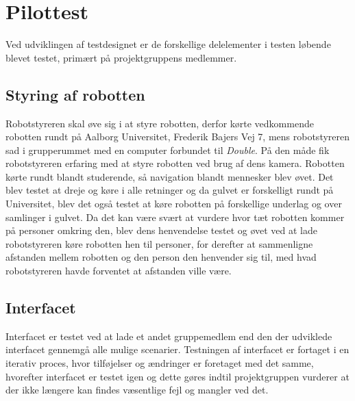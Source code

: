 \section{Pilottest}
\label{ParametrePilottest}
%
Ved udviklingen af testdesignet er de forskellige delelementer i testen løbende blevet testet, primært på projektgruppens medlemmer. \blankline
%
\subsection*{Styring af robotten}
Robotstyreren skal øve sig i at styre robotten, derfor kørte vedkommende robotten rundt på Aalborg Universitet, Frederik Bajers Vej 7, mens robotstyreren sad i grupperummet med en computer forbundet til \textit{Double}. På den måde fik robotstyreren erfaring med at styre robotten ved brug af dens kamera. Robotten kørte rundt blandt studerende, så navigation blandt mennesker blev øvet. Det blev testet at dreje og køre i alle retninger og da gulvet er forskelligt rundt på Universitet, blev det også testet at køre robotten på forskellige underlag og over samlinger i gulvet. 
% 
Da det kan være svært at vurdere hvor tæt robotten kommer på personer omkring den, blev dens henvendelse testet og øvet ved at lade robotstyreren køre robotten hen til personer, for derefter at sammenligne afstanden mellem robotten og den person den henvender sig til, med hvad robotstyreren havde forventet at afstanden ville være. \blankline
%
\subsection*{Interfacet}
Interfacet er testet ved at lade et andet gruppemedlem end den der udviklede interfacet gennemgå alle mulige scenarier. Testningen af interfacet er fortaget i en iterativ proces, hvor tilføjelser og ændringer er foretaget med det samme, hvorefter interfacet er testet igen og dette gøres indtil projektgruppen vurderer at der ikke længere kan findes væsentlige fejl og mangler ved det. \blankline


